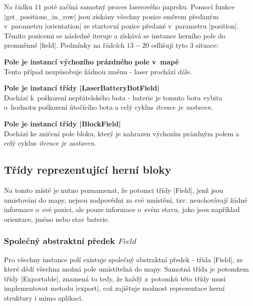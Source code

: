 Na řádku $11$ poté začíná samotný proces laserového paprsku. Pomocí funkce \ic|get_positions_in_row| jsou získány všechny pozice směrem předaným v~parametru \ic|orientation| ze startovní pozice předané v~parametru \ic|position|. Těmito pozicemi se následně iteruje a získává se instance herního pole do promněnné \ic|field|. Podmínky na řádcích $13-20$ odlišují tyto 3 situace:
\begin{description}
    \item {\bfseries Pole je instancí výchozího prázdného pole v~mapě} \\
        Tento případ nezpůsobuje žádnou změnu - laser prochází dále.

    \item {\bfseries Pole je instancí třídy \ic|LaserBatteryBotField|} \\
        Dochází k~poškození nepřátelského bota - baterie je tomuto botu vybita o~hodnotu poškození útočícího bota a celý cyklus \emph{iterace je zastaven}.

    \item {\bfseries Pole je instancí třídy \ic|BlockField|} \\
        Dochází ke zničení pole bloku, který je nahrazen výchozím prázdným polem a celý cyklus \emph{iterace je zastaven}.
\end{description}

\subsection{Třídy reprezentující herní bloky}

Na tomto místě je nutno poznamenat, že potomci třídy \ic|Field|, jenž jsou umisťováni do mapy, nejsou zodpovědni za své umístění, tzv. neuchovávají žádné informace o~své pozici, ale pouze informace o~svém stavu, jako jsou například orientace, jméno nebo stav baterie. 

\subsubsection{Společný abstraktní předek $Field$}

\begin{sloppypar}
	Pro všechny instance polí existuje společný abstraktní předek - třída \ic|Field|, ze které dědí všechna možná pole umístitelná do mapy. Samotná třída je potomkem třídy \ic|Exportable|, znamená to tedy, že každý z~potomků této třídy musí implementovat metodu \ic|export|, což zajištuje možnost reprezentace herní struktury i mimo aplikaci.
\end{sloppypar}

